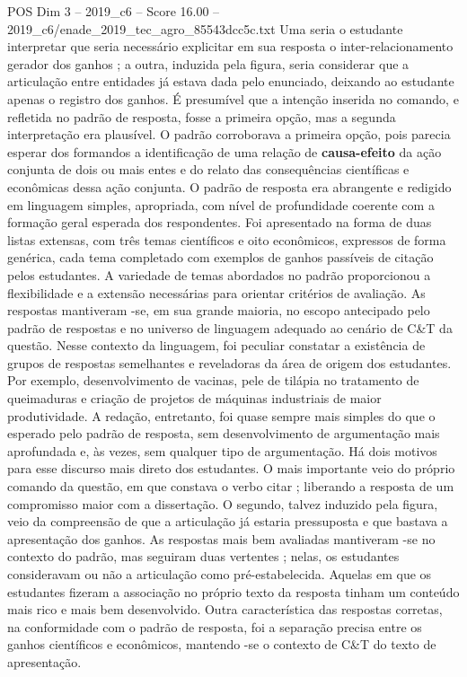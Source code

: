 \begin{textsample}{POS Dim 3 – 2019\_c6 – Score 16.00 – 2019\_c6/enade\_2019\_tec\_agro\_85543dcc5c.txt}
Uma seria o estudante interpretar que seria necessário explicitar em sua resposta o inter-relacionamento gerador dos ganhos ; a outra, induzida pela figura, seria considerar que a articulação entre entidades já estava dada pelo enunciado, deixando ao estudante apenas o registro dos ganhos.
É presumível que a intenção inserida no comando, e refletida no padrão de resposta, fosse a primeira opção, mas a segunda interpretação era plausível.
O padrão corroborava a primeira opção, pois parecia esperar dos formandos a identificação de uma relação de \textbf{causa-efeito} da ação conjunta de dois ou mais entes e do relato das consequências científicas e econômicas dessa ação conjunta.
O padrão de resposta era abrangente e redigido em linguagem simples, apropriada, com nível de profundidade coerente com a formação geral esperada dos respondentes.
Foi apresentado na forma de duas listas extensas, com três temas científicos e oito econômicos, expressos de forma genérica, cada tema completado com exemplos de ganhos passíveis de citação pelos estudantes.
A variedade de temas abordados no padrão proporcionou a flexibilidade e a extensão necessárias para orientar critérios de avaliação.
As respostas mantiveram -se, em sua grande maioria, no escopo antecipado pelo padrão de respostas e no universo de linguagem adequado ao cenário de C\&T da questão.
Nesse contexto da linguagem, foi peculiar constatar a existência de grupos de respostas semelhantes e reveladoras da área de origem dos estudantes.
Por exemplo, desenvolvimento de vacinas, pele de tilápia no tratamento de queimaduras e criação de projetos de máquinas industriais de maior produtividade.
A redação, entretanto, foi quase sempre mais simples do que o esperado pelo padrão de resposta, sem desenvolvimento de argumentação mais aprofundada e, às vezes, sem qualquer tipo de argumentação.
Há dois motivos para esse discurso mais direto dos estudantes.
O mais importante veio do próprio comando da questão, em que constava o verbo citar ; liberando a resposta de um compromisso maior com a dissertação.
O segundo, talvez induzido pela figura, veio da compreensão de que a articulação já estaria pressuposta e que bastava a apresentação dos ganhos.
As respostas mais bem avaliadas mantiveram -se no contexto do padrão, mas seguiram duas vertentes ; nelas, os estudantes consideravam ou não a articulação como pré-estabelecida.
Aquelas em que os estudantes fizeram a associação no próprio texto da resposta tinham um conteúdo mais rico e mais bem desenvolvido.
Outra característica das respostas corretas, na conformidade com o padrão de resposta, foi a separação precisa entre os ganhos científicos e econômicos, mantendo -se o contexto de C\&T do texto de apresentação.

\end{textsample}
